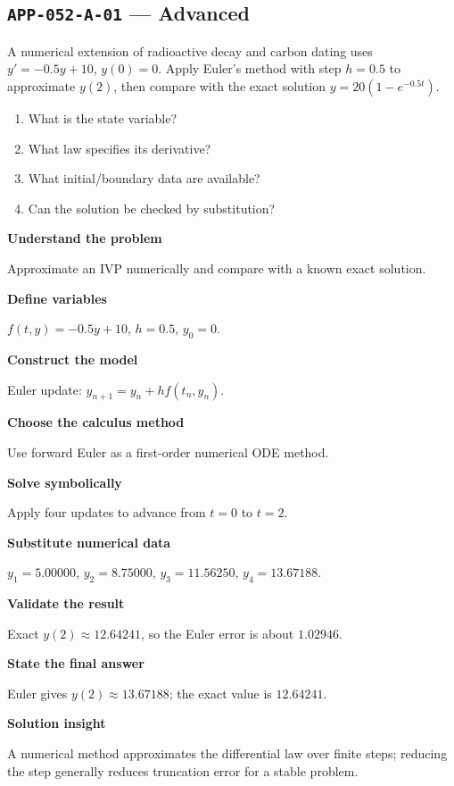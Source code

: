 \documentclass[11pt]{book}
\newcommand{\pid}[1]{\texttt{#1}}
\begin{document}
\subsection*{\pid{APP-052-A-01} — Advanced}
\begin{problembox}
A numerical extension of radioactive decay and carbon dating uses $y'=-0.5y+10$, $y(0)=0$. Apply Euler's method with step $h=0.5$ to approximate $y(2)$, then compare with the exact solution $y=20(1-e^{-0.5t})$.
\end{problembox}
\begin{promptbox}\begin{enumerate}
\item What is the state variable?
\item What law specifies its derivative?
\item What initial/boundary data are available?
\item Can the solution be checked by substitution?
\end{enumerate}\end{promptbox}
\begin{solutionbox}
\textbf{Understand the problem}\par Approximate an IVP numerically and compare with a known exact solution.\par\medskip
\textbf{Define variables}\par $f(t,y)=-0.5y+10$, $h=0.5$, $y_0=0$.\par\medskip
\textbf{Construct the model}\par Euler update: $y_{n+1}=y_n+h f(t_n,y_n)$.\par\medskip
\textbf{Choose the calculus method}\par Use forward Euler as a first-order numerical ODE method.\par\medskip
\textbf{Solve symbolically}\par Apply four updates to advance from $t=0$ to $t=2$.\par\medskip
\textbf{Substitute numerical data}\par $y_1=5.00000$, $y_2=8.75000$, $y_3=11.56250$, $y_4=13.67188$.\par\medskip
\textbf{Validate the result}\par Exact $y(2)\approx 12.64241$, so the Euler error is about $1.02946$.\par\medskip
\textbf{State the final answer}\par Euler gives $y(2)\approx 13.67188$; the exact value is $12.64241$.\par\medskip
\textbf{Solution insight}\par A numerical method approximates the differential law over finite steps; reducing the step generally reduces truncation error for a stable problem.\par\medskip
\end{solutionbox}
\end{document}
